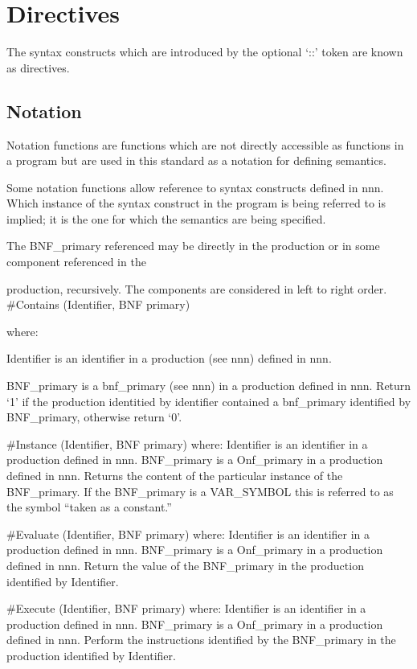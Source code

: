\hypertarget{directives}{%
\chapter{Directives}\label{directives}}

The syntax constructs which are introduced by the optional `::' token
are known as directives.

\hypertarget{notation}{%
\section{Notation}\label{notation}}

Notation functions are functions which are not directly accessible as
functions in a program but are used in this standard as a notation for
defining semantics.

Some notation functions allow reference to syntax constructs defined in
nnn. Which instance of the syntax construct in the program is being
referred to is implied; it is the one for which the semantics are being
specified.

The BNF\_primary referenced may be directly in the production or in some
component referenced in the

production, recursively. The components are considered in left to right
order. \#Contains (Identifier, BNF primary)

where:

Identifier is an identifier in a production (see nnn) defined in nnn.

BNF\_primary is a bnf\_primary (see nnn) in a production defined in nnn.
Return `1' if the production identitied by identifier contained a
bnf\_primary identified by BNF\_primary, otherwise return `0'.

\#Instance (Identifier, BNF primary) where: Identifier is an identifier
in a production defined in nnn. BNF\_primary is a Onf\_primary in a
production defined in nnn. Returns the content of the particular
instance of the BNF\_primary. If the BNF\_primary is a VAR\_SYMBOL this
is referred to as the symbol ``taken as a constant.''

\#Evaluate (Identifier, BNF primary) where: Identifier is an identifier
in a production defined in nnn. BNF\_primary is a Onf\_primary in a
production defined in nnn. Return the value of the BNF\_primary in the
production identified by Identifier.

\#Execute (Identifier, BNF primary) where: Identifier is an identifier
in a production defined in nnn. BNF\_primary is a Onf\_primary in a
production defined in nnn. Perform the instructions identified by the
BNF\_primary in the production identified by Identifier.

